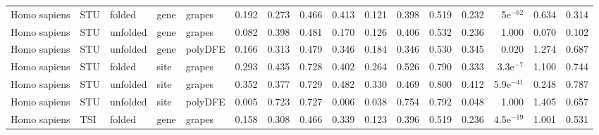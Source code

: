 \begin{longtable}{lllllrrrrrrrrrrr}
        Homo sapiens &                       STU &    folded &  gene &   grapes &                              0.192 &                               0.273 &                 0.466 &                 0.413 &                              0.121 &                               0.398 &                 0.519 &                 0.232 &    5e$^{-62}$ &  0.634 &  0.314 \\
        Homo sapiens &                       STU &  unfolded &  gene &   grapes &                              0.082 &                               0.398 &                 0.481 &                 0.170 &                              0.126 &                               0.406 &                 0.532 &                 0.236 &         1.000 &  0.070 &  0.102 \\
        Homo sapiens &                       STU &  unfolded &  gene &  polyDFE &                              0.166 &                               0.313 &                 0.479 &                 0.346 &                              0.184 &                               0.346 &                 0.530 &                 0.345 &         0.020 &  1.274 &  0.687 \\
        Homo sapiens &                       STU &    folded &  site &   grapes &                              0.293 &                               0.435 &                 0.728 &                 0.402 &                              0.264 &                               0.526 &                 0.790 &                 0.333 &   3.3e$^{-7}$ &  1.100 &  0.744 \\
        Homo sapiens &                       STU &  unfolded &  site &   grapes &                              0.352 &                               0.377 &                 0.729 &                 0.482 &                              0.330 &                               0.469 &                 0.800 &                 0.412 &  5.9e$^{-41}$ &  0.248 &  0.787 \\
        Homo sapiens &                       STU &  unfolded &  site &  polyDFE &                              0.005 &                               0.723 &                 0.727 &                 0.006 &                              0.038 &                               0.754 &                 0.792 &                 0.048 &         1.000 &  1.405 &  0.657 \\
        Homo sapiens &                       TSI &    folded &  gene &   grapes &                              0.158 &                               0.308 &                 0.466 &                 0.339 &                              0.123 &                               0.396 &                 0.519 &                 0.236 &  4.5e$^{-19}$ &  1.001 &  0.531 \\

\end{longtable}
